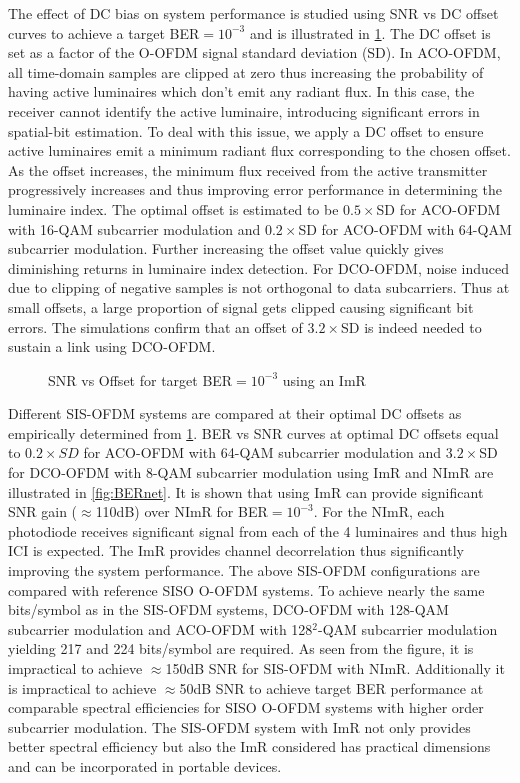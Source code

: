 \documentclass[12pt,letterpaper,onecolumn]{article} %
\begin{document}
The effect of DC bias on system performance is studied using SNR vs DC offset curves to achieve a target BER$=10^{-3}$ and is illustrated in \figurename{\ref{fig:SNRvsOfst}}. The DC offset is set as a factor of the O-OFDM signal standard deviation (SD). In ACO-OFDM, all time-domain samples are clipped at zero thus increasing the probability of having active luminaires which don't emit any radiant flux. In this case, the receiver cannot identify the active luminaire, introducing significant errors in spatial-bit estimation. To deal with this issue, we apply a DC offset to ensure active luminaires emit a minimum radiant flux corresponding to the chosen offset. As the offset increases, the minimum flux received from the active transmitter progressively increases and thus improving error performance in determining the luminaire index. The optimal offset is estimated to be $0.5\times$SD for ACO-OFDM with 16-QAM subcarrier modulation and $0.2\times$SD for ACO-OFDM with 64-QAM subcarrier modulation. Further increasing the offset value quickly gives diminishing returns in luminaire index detection. For DCO-OFDM, noise induced due to clipping of negative samples is not orthogonal to data subcarriers. Thus at small offsets, a large proportion of signal gets clipped causing significant bit errors. The simulations confirm that an offset of $3.2\times$SD is indeed needed to sustain a link using DCO-OFDM.
\begin{figure}[!t]
\makebox[\textwidth]{\framebox[3.3in]{\rule{0pt}{2.48in}}}
\caption{SNR vs Offset for target BER$= 10^{-3}$ using an ImR}
	\label{fig:SNRvsOfst}
\end{figure}

{\color{red}Different SIS-OFDM systems are compared at their optimal DC offsets as empirically determined from \figurename{\ref{fig:SNRvsOfst}}.} BER vs SNR curves at {\color{red}optimal} DC offsets equal to {\color{red}$0.2\times SD$ for ACO-OFDM with 64-QAM subcarrier modulation and $3.2\times$SD for DCO-OFDM with 8-QAM subcarrier modulation} using ImR and NImR are illustrated in \figurename{\ref{fig:BERnet}}. It is shown that using ImR can provide significant SNR gain ($\approx$110dB) over NImR for BER$=10^{-3}$. For the NImR, each photodiode receives significant signal from each of the 4 luminaires and thus high ICI is expected. The ImR provides channel decorrelation thus significantly improving the system performance. {\color{red}The above SIS-OFDM configurations are compared with reference SISO O-OFDM systems. To achieve nearly the same bits/symbol as in the SIS-OFDM systems, DCO-OFDM with 128-QAM subcarrier modulation and ACO-OFDM with 128$^2$-QAM subcarrier modulation yielding 217 and 224 bits/symbol are required. As seen from the figure, it is impractical to achieve $\approx$150dB SNR for SIS-OFDM with NImR. Additionally it is impractical to achieve $\approx$50dB SNR to achieve target BER performance at comparable spectral efficiencies for SISO O-OFDM systems with higher order subcarrier modulation. The SIS-OFDM system with ImR not only provides better spectral efficiency but also the ImR considered has practical dimensions and can be incorporated in portable devices.} 
\end{document}

